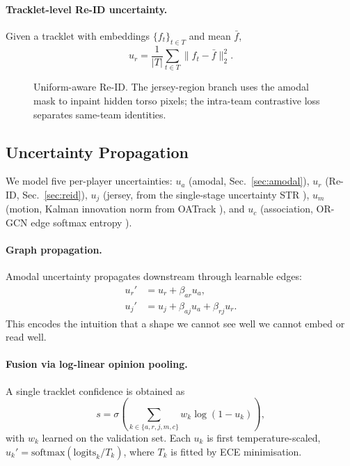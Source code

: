 \documentclass[conference]{IEEEtran}
\begin{document}
\paragraph*{Tracklet-level Re-ID uncertainty.}
Given a tracklet with embeddings $\{f_t\}_{t\in T}$ and mean $\bar f$,
\begin{equation}
u_r = \frac{1}{|T|}\sum_{t\in T}\|f_t-\bar f\|_2^2.
\end{equation}

\begin{figure}[t]
  \centering
  \caption{Uniform-aware Re-ID. The jersey-region branch uses the amodal mask to inpaint hidden torso pixels; the intra-team contrastive loss separates same-team identities.}
  \label{fig:reid}
\end{figure}

\subsection{Uncertainty Propagation}
\label{sec:unc}

We model five per-player uncertainties: $u_a$ (amodal, Sec.~\ref{sec:amodal}), $u_r$ (Re-ID, Sec.~\ref{sec:reid}), $u_j$ (jersey, from the single-stage uncertainty STR \cite{uncertaintyjersey}), $u_m$ (motion, Kalman innovation norm from OATrack \cite{oatrack}), and $u_c$ (association, OR-GCN edge softmax entropy \cite{occgcn}).

\paragraph*{Graph propagation.}
Amodal uncertainty propagates downstream through learnable edges:
\begin{align}
u_r' &= u_r + \beta_{ar} u_a, \label{eq:up_ur}\\
u_j' &= u_j + \beta_{aj} u_a + \beta_{rj} u_r. \label{eq:up_uj}
\end{align}
This encodes the intuition that a shape we cannot see well we cannot embed or read well.

\paragraph*{Fusion via log-linear opinion pooling.}
A single tracklet confidence is obtained as
\begin{equation}
s = \sigma\!\left(\sum_{k\in\{a,r,j,m,c\}} w_k \log(1-u_k)\right),
\label{eq:fusion}
\end{equation}
with $w_k$ learned on the validation set. Each $u_k$ is first temperature-scaled, $u_k' = \mathrm{softmax}(\text{logits}_k/T_k)$, where $T_k$ is fitted by ECE minimisation.
\end{document}

